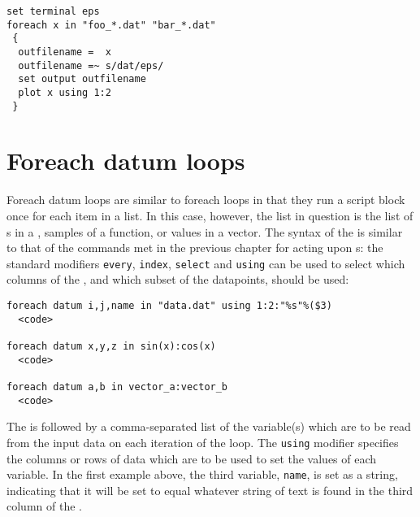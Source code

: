 \begin{verbatim}
set terminal eps
foreach x in "foo_*.dat" "bar_*.dat"
 {
  outfilename =  x
  outfilename =~ s/dat/eps/
  set output outfilename
  plot x using 1:2
 }
\end{verbatim}

\section{Foreach datum loops}
\label{sec:foreach_datum}

Foreach datum loops are similar to foreach loops in that they run a script
block once for each item in a list.  In this case, however, the list in
question is the list of \datapoint s in a \datafile, samples of a function, or
values in a vector. The syntax of the  is similar to
that of the commands met in the previous chapter for acting upon \datafile s:
the standard modifiers {\tt every}, {\tt index}, {\tt select} and {\tt using}
can be used to select which columns of the \datafile, and which subset of the
datapoints, should be used:

\begin{verbatim}
foreach datum i,j,name in "data.dat" using 1:2:"%s"%($3)
  <code>

foreach datum x,y,z in sin(x):cos(x)
  <code>

foreach datum a,b in vector_a:vector_b
  <code>
\end{verbatim}

The  is followed by a comma-separated list of the
variable(s) which are to be read from the input data on each iteration of the
loop. The {\tt using} modifier specifies the columns or rows of data which are
to be used to set the values of each variable. In the first example above, the
third variable, {\tt name}, is set as a string, indicating that it will be set
to equal whatever string of text is found in the third column of the \datafile.

